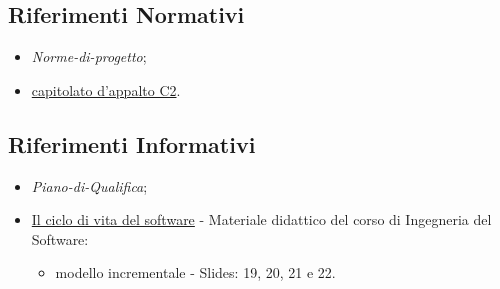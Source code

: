 \subsection{Riferimenti Normativi}
\begin{itemize}
    \item \textit{Norme-di-progetto};
    \item \href{https://www.math.unipd.it/~tullio/IS-1/2022/Progetto/C2.pdf}{capitolato d'appalto C2}.
\end{itemize}

\subsection{Riferimenti Informativi}
\begin{itemize}
    \item \textit{Piano-di-Qualifica};
    \item \href{https://www.math.unipd.it/~tullio/IS-1/2022/Dispense/T03.pdf}{Il ciclo di vita del software} - Materiale didattico del corso di Ingegneria del Software:
    \begin{itemize}
        \item modello incrementale - Slides: 19, 20, 21 e 22.
    \end{itemize}
\end{itemize}